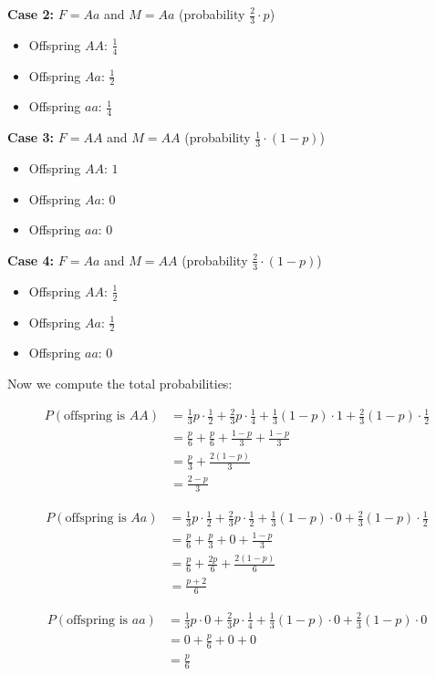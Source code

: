 \documentclass[a4paper, UTF-8]{article}
\theoremstyle{plain}
\begin{document}
\textbf{Case 2:} $F = Aa$ and $M = Aa$ (probability $\frac{2}{3} \cdot p$)
\begin{itemize}
    \item Offspring $AA$: $\frac{1}{4}$
    \item Offspring $Aa$: $\frac{1}{2}$
    \item Offspring $aa$: $\frac{1}{4}$
\end{itemize}

\textbf{Case 3:} $F = AA$ and $M = AA$ (probability $\frac{1}{3} \cdot (1-p)$)
\begin{itemize}
    \item Offspring $AA$: $1$
    \item Offspring $Aa$: $0$
    \item Offspring $aa$: $0$
\end{itemize}

\textbf{Case 4:} $F = Aa$ and $M = AA$ (probability $\frac{2}{3} \cdot (1-p)$)
\begin{itemize}
    \item Offspring $AA$: $\frac{1}{2}$
    \item Offspring $Aa$: $\frac{1}{2}$
    \item Offspring $aa$: $0$
\end{itemize}

Now we compute the total probabilities:

\begin{align*}
P(\text{offspring is } AA) &= \frac{1}{3}p \cdot \frac{1}{2} + \frac{2}{3}p \cdot \frac{1}{4} + \frac{1}{3}(1-p) \cdot 1 + \frac{2}{3}(1-p) \cdot \frac{1}{2}\\
&= \frac{p}{6} + \frac{p}{6} + \frac{1-p}{3} + \frac{1-p}{3}\\
&= \frac{p}{3} + \frac{2(1-p)}{3}\\
&= \frac{2-p}{3}
\end{align*}

\begin{align*}
P(\text{offspring is } Aa) &= \frac{1}{3}p \cdot \frac{1}{2} + \frac{2}{3}p \cdot \frac{1}{2} + \frac{1}{3}(1-p) \cdot 0 + \frac{2}{3}(1-p) \cdot \frac{1}{2}\\
&= \frac{p}{6} + \frac{p}{3} + 0 + \frac{1-p}{3}\\
&= \frac{p}{6} + \frac{2p}{6} + \frac{2(1-p)}{6}\\
&= \frac{p + 2}{6}
\end{align*}

\begin{align*}
P(\text{offspring is } aa) &= \frac{1}{3}p \cdot 0 + \frac{2}{3}p \cdot \frac{1}{4} + \frac{1}{3}(1-p) \cdot 0 + \frac{2}{3}(1-p) \cdot 0\\
&= 0 + \frac{p}{6} + 0 + 0\\
&= \frac{p}{6}
\end{align*}
\end{document}
